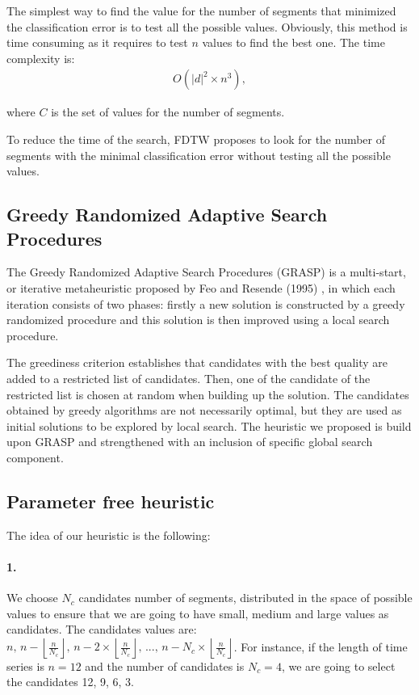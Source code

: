 The simplest way to find the value for the number of segments that minimized the
classification error is to test all the possible values.  Obviously, this
method is time consuming as it requires to test $n$ values to find the best one. The time complexity is:
\begin{eqnarray}
O(|d|^{2} \times n^{3}),
\end{eqnarray}

where $C$ is the set of values for the number of segments.

To reduce the time of the search,  FDTW proposes to look for the
number of segments with the minimal classification error without testing all the possible values.

\subsection{ Greedy Randomized Adaptive Search Procedures}
The Greedy Randomized Adaptive Search Procedures (GRASP) is a multi-start, or iterative metaheuristic proposed by Feo and Resende
(1995) \cite{feo1995greedy}, in which each iteration consists of two phases:
firstly a new solution is constructed by a greedy randomized
procedure and this solution is then improved using a local search procedure.


The greediness criterion establishes that candidates with the best quality are
 added to a restricted list of candidates. Then, one of the candidate of the restricted list is  chosen at random when
building up the solution. The candidates obtained by greedy algorithms are not
necessarily optimal, but they are used as initial solutions
to be explored by local search. The heuristic  we proposed is build upon
GRASP and strengthened with an inclusion of specific global search component.




\subsection{Parameter free heuristic}
The idea of our heuristic is the following:
\paragraph{1.} We choose $N_{c}$ candidates number of segments, distributed in the space of possible values
to ensure that we are going to have small, medium and large values as
candidates. The candidates values are: $n,\,n-\left\lfloor
\frac{n}{N_{c}}\right\rfloor ,\,n-2\times\left\lfloor \frac{n}{N_{c}}\right\rfloor
,\,...,\,n-N_{c}\times\left\lfloor \frac{n}{N_{c}}\right\rfloor $. For instance, if the length of
time series is $n = 12$ and the number of candidates is $N_c = 4$, we are going to select the
candidates 12, 9, 6, 3.

